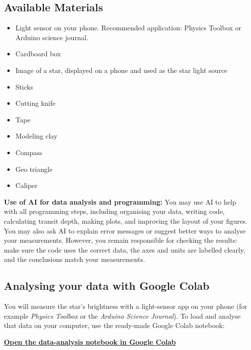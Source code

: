\documentclass[12pt]{article}
\begin{document}
\subsection*{Available Materials}

\begin{itemize}
    \item Light sensor on your phone. Recommended application: Physics Toolbox or Arduino science journal.
    \item Cardboard box
    \item Image of a star, displayed on a phone and used as the star light source
    \item Sticks
    \item Cutting knife
    \item Tape
    \item Modeling clay
    \item Compass
    \item Geo triangle
    \item Caliper
\end{itemize}

\begin{importantbox}
\textbf{Use of AI for data analysis and programming:} You may use AI to help with all programming steps, including organising your data, writing code, calculating transit depth, making plots, and improving the layout of your figures. You may also ask AI to explain error messages or suggest better ways to analyse your measurements. However, you remain responsible for checking the results: make sure the code uses the correct data, the axes and units are labelled clearly, and the conclusions match your measurements.
\end{importantbox}

\subsection*{Analysing your data with Google Colab}

You will measure the star's brightness with a light-sensor app on your phone (for example \emph{Physics Toolbox} or the \emph{Arduino Science Journal}). To load and analyse that data on your computer, use the ready-made Google Colab notebook:

\begin{center}
\href{https://colab.research.google.com/github/TAITeachingWithAI/ScientificAILab/blob/main/notebooks/exoplanet_transit_analysis.ipynb}{\textbf{Open the data-analysis notebook in Google Colab}}
\end{center}
\end{document}
